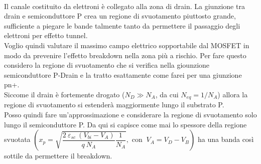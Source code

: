 \\%
Il canale costituito da elettroni è collegato alla zona di drain. La giunzione tra drain e semiconduttore P crea un regione di svuotamento piuttosto grande, sufficiente a piegare le bande talmente tanto da permettere il passaggio degli elettroni per effetto tunnel.\\
Voglio quindi valutare il massimo campo elettrico sopportabile dal MOSFET in modo da prevenire l'effetto breakdown nella zona più a rischio. Per fare questo considero la regione di svuotamento che si verifica nella giounzione semiconduttore P-Drain e la tratto esattamente come farei per una giunzione pn+.\\
Siccome il drain è fortemente drogato ($N_D\gg N_A$, da cui $N_{eq}=1/N_A$) allora la regione di svuotamento si estenderà maggiormente lungo il substrato P.\\
Posso quindi fare un'approssimazione e considerare la regione di svuotamento solo lungo il semiconduttore P. Da qui si capisce come mai  lo spessore della regione svuotata $\left(x_p=\sqrt{\dfrac{2\ \varepsilon_{sc} \ (V_{bi}-V_{A})}{q\ N_A}\dfrac{1}{N_A}}, \text{ con } \ V_A=V_D-V_B\right)$ ha una banda così sottile da  permettere il breakdown.\\

